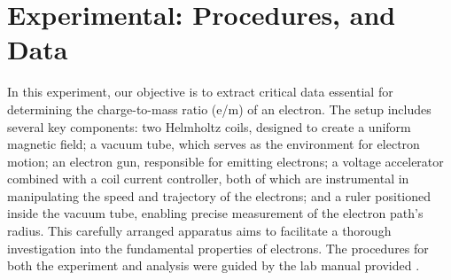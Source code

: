 \documentclass{article}
\begin{document}
\section{Experimental: Procedures, and Data}
In this experiment, our objective is to extract critical data essential for determining the charge-to-mass ratio (e/m) of an electron. The setup includes several key components: two Helmholtz coils, designed to create a uniform magnetic field; a vacuum tube, which serves as the environment for electron motion; an electron gun, responsible for emitting electrons; a voltage accelerator combined with a coil current controller, both of which are instrumental in manipulating the speed and trajectory of the electrons; and a ruler positioned inside the vacuum tube, enabling precise measurement of the electron path's radius. This carefully arranged apparatus aims to facilitate a thorough investigation into the fundamental properties of electrons. The procedures for both the experiment and analysis were guided by the lab manual provided \textcite{Boeglin2024}.
\end{document}
